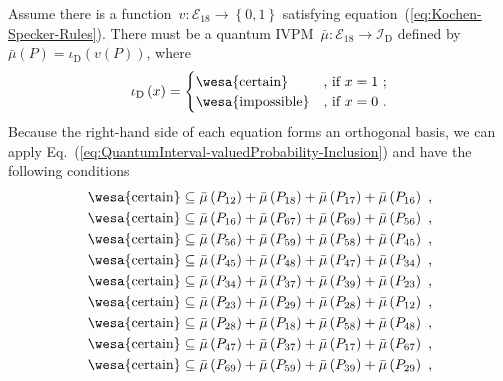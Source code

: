 \documentclass[english,reprint, aps, prl,superscriptaddress, showpacs,
showkeys, longbibliography, amsmath, amssymb]{revtex4-1}
\theoremstyle{plain}
\theoremstyle{definition}
\newcommand{\events}{\ensuremath{\mathcal{E}}}
\newcommand{\imposs}{{\text{\wesa{impossible}}}}
\newcommand{\necess}{{\text{\wesa{certain}}}}
\begin{document}
Assume there is a function~$v:\events_{18}\rightarrow\left\{ 0,1\right\} $
satisfying equation~(\ref{eq:Kochen-Specker-Rules}). There must
be a quantum IVPM~$\bar{\mu}:\events_{18}\rightarrow\mathscr{I}_{\mathrm{D}}$
defined by $\bar{\mu}\left(P\right)=\iota_{\mathrm{D}}\left(v\left(P\right)\right)$,
where 
\begin{equation}
\iota_{\mathrm{D}}\left(x\right)=\begin{cases}
\necess & \text{, if }x=1\text{ ;}\\
\imposs & \text{, if }x=0\text{ .}
\end{cases}\label{eq:homomorphism-0}
\end{equation}
Because the right-hand side of each equation forms an orthogonal basis,
we can apply Eq.~(\ref{eq:QuantumInterval-valuedProbability-Inclusion})
and have the following conditions 
\begin{equation}
\begin{aligned}\necess & \subseteq\bar{\mu}\left(P_{12}\right)+\bar{\mu}\left(P_{18}\right)+\bar{\mu}\left(P_{17}\right)+\bar{\mu}\left(P_{16}\right)\textrm{ ,}\\
\necess & \subseteq\bar{\mu}\left(P_{16}\right)+\bar{\mu}\left(P_{67}\right)+\bar{\mu}\left(P_{69}\right)+\bar{\mu}\left(P_{56}\right)\textrm{ ,}\\
\necess & \subseteq\bar{\mu}\left(P_{56}\right)+\bar{\mu}\left(P_{59}\right)+\bar{\mu}\left(P_{58}\right)+\bar{\mu}\left(P_{45}\right)\textrm{ ,}\\
\necess & \subseteq\bar{\mu}\left(P_{45}\right)+\bar{\mu}\left(P_{48}\right)+\bar{\mu}\left(P_{47}\right)+\bar{\mu}\left(P_{34}\right)\textrm{ ,}\\
\necess & \subseteq\bar{\mu}\left(P_{34}\right)+\bar{\mu}\left(P_{37}\right)+\bar{\mu}\left(P_{39}\right)+\bar{\mu}\left(P_{23}\right)\textrm{ ,}\\
\necess & \subseteq\bar{\mu}\left(P_{23}\right)+\bar{\mu}\left(P_{29}\right)+\bar{\mu}\left(P_{28}\right)+\bar{\mu}\left(P_{12}\right)\textrm{ ,}\\
\necess & \subseteq\bar{\mu}\left(P_{28}\right)+\bar{\mu}\left(P_{18}\right)+\bar{\mu}\left(P_{58}\right)+\bar{\mu}\left(P_{48}\right)\textrm{ ,}\\
\necess & \subseteq\bar{\mu}\left(P_{47}\right)+\bar{\mu}\left(P_{37}\right)+\bar{\mu}\left(P_{17}\right)+\bar{\mu}\left(P_{67}\right)\textrm{ ,}\\
\necess & \subseteq\bar{\mu}\left(P_{69}\right)+\bar{\mu}\left(P_{59}\right)+\bar{\mu}\left(P_{39}\right)+\bar{\mu}\left(P_{29}\right)\textrm{ ,}
\end{aligned}
\label{eq:CEGA}
\end{equation}
\end{document}
